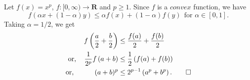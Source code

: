 \begin{solution}
        Let $f(x)=x^p$, $f:[0, \infty)\to \mathbf{R}$ and
    $p\geq 1$. Since $f$ is a $convex$ function, we have
    $$f(\alpha x +(1-\alpha)y)\leq\alpha f(x)+(1-\alpha)
    f(y)\ \ \text{for } \alpha\in [0,1].$$
    Taking $\alpha=1/2$, we get
    \begin{align*}
        f\left(\frac{a}{2}+\frac{b}{2}\right)
        &\leq \frac{f(a)}{2}+\frac{f(b)}{2}\\
        \text{or, }\hspace{3mm}
        \frac{1}{2^p}f\left(a+b\right)
        &\leq \frac{1}{2}\left(f(a)+f(b)\right)\\
        \text{or, }\hspace{9.5mm} (a+b)^p
        &\leq 2^{p-1}\left(a^p+b^p\right).\qed
    \end{align*}
\end{solution}